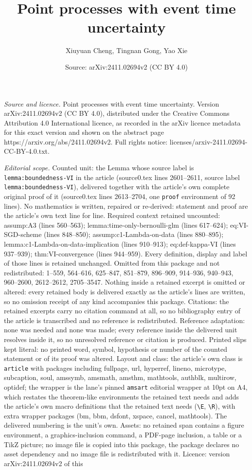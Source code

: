\documentclass[10pt,a4paper]{amsart}
\title[Point processes with event time uncertainty]{Point processes with event time uncertainty}
\author{Xiuyuan Cheng, Tingnan Gong, Yao Xie}
\date{Source: arXiv:2411.02694v2 (CC BY 4.0)}
\begin{document}
\maketitle

\noindent\emph{Source and licence.} Point processes with event time uncertainty. Version arXiv:2411.02694v2 (CC BY 4.0), distributed under the Creative Commons Attribution 4.0 International licence, as recorded in the arXiv licence metadata for this exact version and shown on the abstract page https://arxiv.org/abs/2411.02694v2. Full rights notice: licenses/arxiv-2411.02694-CC-BY-4.0.txt.\par\smallskip

\noindent\textit{Editorial scope.} Counted unit: the Lemma whose source label is \texttt{lemma:boundedness-VI} in the article (source0.tex lines 2601--2611, source label \texttt{lemma:boundedness-VI}), delivered together with the article's own complete original proof of it (source0.tex lines 2613--2704, one \texttt{proof} environment of 92 lines). No mathematics is written, repaired or re-derived: statement and proof are the article's own text line for line. Required context retained uncounted: assump:A3 (lines 560--563); lemma:time-only-bernoulli-glm (lines 617--624); eq:VI-SGD-scheme (lines 848--850); assump:c1-Lambda-on-data (lines 880--895); lemma:c1-Lambda-on-data-implication (lines 910--913); eq:def-kappa-VI (lines 937--939); thm:VI-convergence (lines 944--959). Every definition, display and label of those lines is retained unchanged. Omitted from this package and not redistributed: 1--559, 564--616, 625--847, 851--879, 896--909, 914--936, 940--943, 960--2600, 2612--2612, 2705--3547. Nothing inside a retained excerpt is omitted or altered: every retained body is delivered exactly as the article's lines are written, so no omission receipt of any kind accompanies this package. Citations: the retained excerpts carry no citation command at all, so no bibliography entry of the article is transcribed and no reference is redistributed. Reference adaptation: none was needed and none was made; every reference inside the delivered unit resolves inside it, so no unresolved reference or citation is produced. Printed slips kept literal: no printed word, symbol, hypothesis or number of the counted statement or of its proof was altered. Layout and class: the article's own class is \texttt{article} with packages including fullpage, url, hyperref, lineno, microtype, subcaption, soul, amssymb, amsmath, amsthm, mathtools, authblk, multirow, optidef; the wrapper is the lane's pinned \texttt{amsart} editorial wrapper at 10pt on A4, which restates the theorem-like environments the retained text needs and adds the article's own macro definitions that the retained text needs (\texttt{\textbackslash E}, \texttt{\textbackslash R}), with extra wrapper packages (bm, bbm, dsfont, xspace, cancel, mathtools). The delivered numbering is the unit's own. Assets: no retained span contains a figure environment, a graphics-inclusion command, a PDF-page inclusion, a table or a TikZ picture; no image file is copied into this package, the package declares no asset dependency and no image file is redistributed with it. Licence: version arXiv:2411.02694v2 of this 
\end{document}
